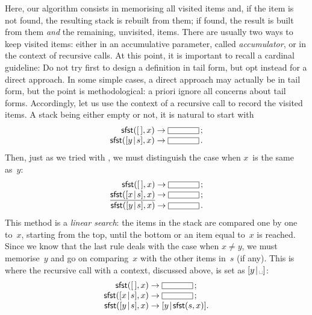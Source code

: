 Here, our algorithm consists in memorising all visited items and, if
the item is not found, the resulting stack is rebuilt from them; if
found, the result is built from them \emph{and} the remaining,
unvisited, items. There are usually two ways to keep visited items:
either in an accumulative parameter, called \emph{accumulator}, or in
the context of recursive calls. At this point, it is important to
recall a cardinal guideline: Do not try first to design a definition
in tail form, but opt instead for a direct approach. In some simple
cases, a direct approach may actually be in tail form, but the point
is methodological: a priori ignore all concerns about tail
forms. Accordingly, let us use the context of a recursive call to
record the visited items. A stack being either empty or not, it is
natural to start with
\begin{equation*}
\begin{array}{r@{\;}l@{\;}l}
\fun{sfst}(\el,x) & \rightarrow & \fbcode{CCCCC}\,;\\
\fun{sfst}(\cons{y}{s},x) & \rightarrow & \fbcode{CCCCC}\,.
\end{array}
\end{equation*}
Then, just as we tried with , we must distinguish the
case when \(x\)~is the same as~\(y\):
\begin{equation*}
\begin{array}{r@{\;}l@{\;}l}
\fun{sfst}(\el,x) & \rightarrow & \fbcode{CCCCC}\,;\\
\underline{\fun{sfst}(\cons{x}{s},x)} & \rightarrow & \fbcode{CCCCC}\,;\\
\fun{sfst}(\cons{y}{s},x) & \rightarrow & \fbcode{CCCCC}\,.
\end{array}
\end{equation*}
This method is a \emph{linear search}: the items
in the stack are compared one by one to~\(x\), starting from the top,
until the bottom or an item equal to~\(x\) is reached. Since we know
that the last rule deals with the case when \(x \neq y\), we must
memorise~\(y\) and go on comparing~\(x\) with the other items in~\(s\)
(if any). This is where the recursive call with a context, discussed
above, is set as \(\cons{y}{\text{\textvisiblespace}}\):
\begin{equation*}
\begin{array}{r@{\;}l@{\;}l}
\fun{sfst}(\el,x) & \rightarrow & \fbcode{CCCCC}\,;\\
\fun{sfst}(\cons{x}{s},x) & \rightarrow & \fbcode{CCCCC}\,;\\
\fun{sfst}(\cons{y}{s},x) & \rightarrow & \cons{y}{\fun{sfst}(s,x)}.
\end{array}
\end{equation*}

